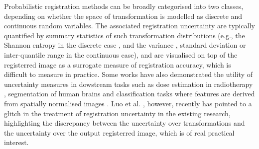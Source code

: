 Probabilistic registration methods can be broadly categorised into two classes, depending on whether the space of transformation is modelled as discrete \cite{cobzas2011random,popuri2013variational,heinrich2016deformable} and continuous \cite{van2008encoding,simpson2012probabilistic,risholm2013bayesian,zhang2013bayesian,wassermann2014probabilistic,simpson2015probabilistic,le2016quantifying} random variables. The associated registration uncertainty are typically quantified by summary statistics of such transformation distributions (e.g., the Shannon entropy in the discrete case \cite{lotfi2013improving}, and the variance \cite{simpson2012probabilistic,le2016quantifying}, standard deviation\cite{simpson2015probabilistic} or inter-quantile range \cite{risholm2013bayesian,risholm2010summarizing} in the continuous case), and are visualised on top of the registerred image as a surrogate measure of registration accuracy, which is difficult to measure in practice. Some works have also demonstrated the utility of uncertainty measures in dowstream tasks such as dose estimation in radiotherapy \cite{risholm2011estimation}, segmentation of human brains \cite{simpson2011probabilistic} and classification tasks where features are derived from spatially normalised images \cite{simpson2012ensemble}. Luo et al. \cite{wells2018miccai}, however, recently has pointed to a glitch in the treatment of registration uncertainty in the existing research, highlighting the discrepancy between the  uncertainty over transformations and the uncertainty over the output registerred image, which is of real practical interest. 




%
%



